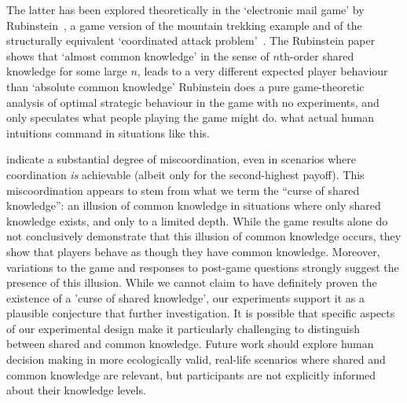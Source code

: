 The latter has been explored theoretically in the  `electronic mail game' by Rubinstein~\cite{rubinstein1989electronic}, a game version of the mountain trekking example and of the structurally equivalent `coordinated attack problem'~\cite{fagin1995reasoning}. The Rubinstein paper shows that `almost common knowledge' in the sense of $n$th-order shared knowledge for some large $n$, leads to a very different expected player behaviour than `absolute common knowledge' Rubinstein does a pure game-theoretic analysis of optimal strategic behaviour in the game with no experiments, and only speculates what people playing the game might do.  what actual human intuitions command in situations like this.

 indicate a substantial degree of miscoordination, even in scenarios where coordination \emph{is} achievable (albeit only for the second-highest payoff). This miscoordination appears to stem from what we term the ``curse of shared knowledge'': an illusion of common knowledge in situations where only shared knowledge exists, and only to a limited depth. While the game results alone do not conclusively demonstrate that this illusion of common knowledge occurs, they show that players behave as though they have common knowledge. Moreover, variations to the game and responses to post-game questions strongly suggest the presence of this illusion. While we cannot claim to have definitely proven the existence of a 'curse of shared knowledge', our experiments support it as a plausible conjecture that  further investigation.  It is possible that specific aspects of our experimental design make it particularly challenging to distinguish between shared and common knowledge.  Future work should explore human decision making in more ecologically valid, real-life scenarios where shared and common knowledge are relevant, but participants are not explicitly informed about their knowledge levels.

